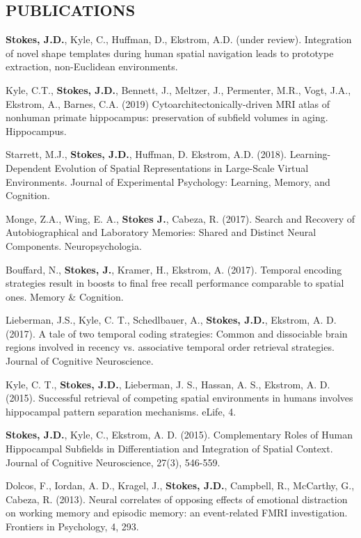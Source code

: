 \documentclass[line,margin,10pt]{res}
\begin{document}
\begin{resume}
\section{PUBLICATIONS}

\textbf{Stokes, J.D.}, Kyle, C., Huffman, D., Ekstrom, A.D. (under review). Integration of novel shape templates during human spatial navigation leads to prototype extraction, non-Euclidean environments.

Kyle, C.T., \textbf{Stokes, J.D.}, Bennett, J., Meltzer, J., Permenter, M.R., Vogt, J.A., Ekstrom, A., Barnes, C.A. (2019) Cytoarchitectonically-driven MRI atlas of nonhuman primate hippocampus:  preservation of subfield volumes in aging. Hippocampus.

Starrett, M.J., \textbf{Stokes, J.D.}, Huffman, D. Ekstrom, A.D. (2018). Learning-Dependent Evolution of Spatial Representations in Large-Scale Virtual Environments. Journal of Experimental Psychology: Learning, Memory, and Cognition.

Monge, Z.A., Wing, E. A., \textbf{Stokes J.}, Cabeza, R. (2017). Search and Recovery of Autobiographical and Laboratory Memories: Shared and Distinct Neural Components. Neuropsychologia.

Bouffard, N., \textbf{Stokes, J.}, Kramer, H., Ekstrom, A. (2017). Temporal encoding strategies result in boosts to final free recall performance comparable to spatial ones. Memory \& Cognition.

Lieberman, J.S., Kyle, C. T., Schedlbauer, A., \textbf{Stokes, J.D.}, Ekstrom, A. D. (2017). A tale of two temporal coding strategies: Common and dissociable brain regions involved in recency vs. associative temporal order retrieval strategies. Journal of Cognitive Neuroscience.

Kyle, C. T., \textbf{Stokes, J.D.}, Lieberman, J. S., Hassan, A. S., Ekstrom, A. D. (2015). Successful retrieval of competing spatial environments in humans involves hippocampal pattern separation mechanisms. eLife, 4. 

\textbf{Stokes, J.D.}, Kyle, C., Ekstrom, A. D. (2015). Complementary Roles of Human Hippocampal Subfields in Differentiation and Integration of Spatial Context. Journal of Cognitive Neuroscience, 27(3), 546-559. 

Dolcos, F., Iordan, A. D., Kragel, J., \textbf{Stokes, J.D.}, Campbell, R., McCarthy, G., Cabeza, R. (2013). Neural correlates of opposing effects of emotional distraction on working memory and episodic memory: an event-related FMRI investigation. Frontiers in Psychology, 4, 293. 


\end{resume}
\end{document}
